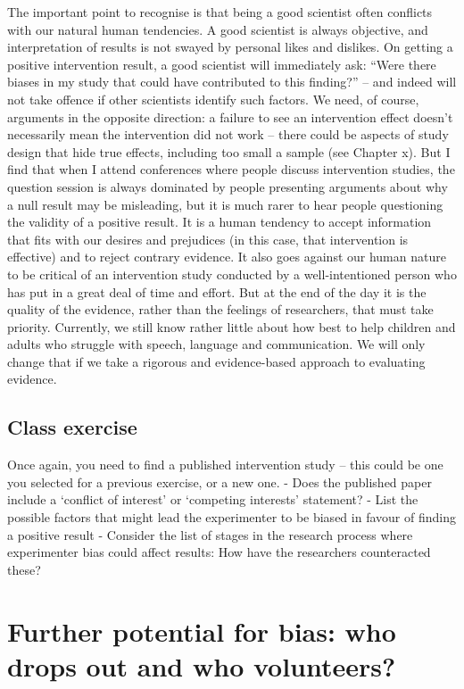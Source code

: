 \documentclass[]{book}
\begin{document}
The important point to recognise is that being a good scientist often conflicts with our natural human tendencies. A good scientist is always objective, and interpretation of results is not swayed by personal likes and dislikes. On getting a positive intervention result, a good scientist will immediately ask: ``Were there biases in my study that could have contributed to this finding?'' -- and indeed will not take offence if other scientists identify such factors. We need, of course, arguments in the opposite direction: a failure to see an intervention effect doesn't necessarily mean the intervention did not work -- there could be aspects of study design that hide true effects, including too small a sample (see Chapter x). But I find that when I attend conferences where people discuss intervention studies, the question session is always dominated by people presenting arguments about why a null result may be misleading, but it is much rarer to hear people questioning the validity of a positive result. It is a human tendency to accept information that fits with our desires and prejudices (in this case, that intervention is effective) and to reject contrary evidence. It also goes against our human nature to be critical of an intervention study conducted by a well-intentioned person who has put in a great deal of time and effort. But at the end of the day it is the quality of the evidence, rather than the feelings of researchers, that must take priority. Currently, we still know rather little about how best to help children and adults who struggle with speech, language and communication. We will only change that if we take a rigorous and evidence-based approach to evaluating evidence.

\hypertarget{class-exercise-4}{%
\section{Class exercise}\label{class-exercise-4}}

Once again, you need to find a published intervention study -- this could be one you selected for a previous exercise, or a new one.
- Does the published paper include a `conflict of interest' or `competing interests' statement?
- List the possible factors that might lead the experimenter to be biased in favour of finding a positive result
- Consider the list of stages in the research process where experimenter bias could affect results: How have the researchers counteracted these?

\hypertarget{further-potential-for-bias-who-drops-out-and-who-volunteers}{%
\chapter{Further potential for bias: who drops out and who volunteers?}\label{further-potential-for-bias-who-drops-out-and-who-volunteers}}
\end{document}
